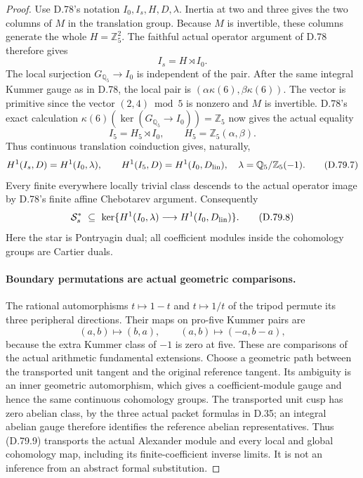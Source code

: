 \begin{proof}
Use D.78's notation \(I_0,I_s,H,D,\lambda\). Inertia at two and
three gives the two columns of \(M\) in the translation group.
Because \(M\) is invertible, these columns generate the whole
\(H=\mathbb Z_5^2\). The faithful actual operator argument of
D.78 therefore gives
\[
 I_s=H\rtimes I_0.
                                                               \tag{D.79.5}
\]
The local surjection \(G_{\mathbb Q_5}\to I_0\) is independent
of the pair. After the same integral Kummer gauge as in D.78,
the local pair is \((\alpha\kappa(6),\beta\kappa(6))\).
The vector is primitive since the vector \((2,4)\bmod5\) is
nonzero and \(M\) is invertible. D.78's exact calculation
\(\kappa(6)(\ker(G_{\mathbb Q_5}\to I_0))=\mathbb Z_5\)
now gives the actual equality
\[
 I_5=H_5\rtimes I_0,
 \qquad H_5=\mathbb Z_5(\alpha,\beta).
                                                               \tag{D.79.6}
\]
Thus continuous translation coinduction gives, naturally,
\[
 H^1(I_s,D)=H^1(I_0,\lambda),\qquad
 H^1(I_5,D)=H^1(I_0,D_{\rm lin}),
 \quad\lambda=\mathbb Q_5/\mathbb Z_5(-1).
                                                               \tag{D.79.7}
\]
Every finite everywhere locally trivial class descends to the actual
operator image by D.78's finite affine Chebotarev argument.
Consequently
\[
 \mathcal S_s^*\ \subseteq\
 \ker\{H^1(I_0,\lambda)\longrightarrow H^1(I_0,D_{\rm lin})\}.
                                                               \tag{D.79.8}
\]
Here the star is Pontryagin dual; all coefficient modules inside
the cohomology groups are Cartier duals.

\paragraph{Boundary permutations are actual geometric comparisons.}
The rational automorphisms \(t\mapsto1-t\) and \(t\mapsto1/t\)
of the tripod permute its three peripheral directions. Their
maps on pro-five Kummer pairs are
\[
 (a,b)\longmapsto(b,a),\qquad
 (a,b)\longmapsto(-a,b-a),                              \tag{D.79.9}
\]
because the extra Kummer class of \(-1\) is zero at five.
These are comparisons of the actual arithmetic fundamental
extensions. Choose a geometric path between the transported unit
tangent and the original reference tangent. Its ambiguity is an
inner geometric automorphism, which gives a coefficient-module
gauge and hence the same continuous cohomology groups. The
transported unit cusp has zero abelian class, by the three actual
packet formulas in D.35; an integral abelian gauge therefore
identifies the reference abelian representatives. Thus (D.79.9)
transports the actual Alexander module and every local and global
cohomology map, including its finite-coefficient inverse limits.
It is not an inference from an abstract formal substitution.


\end{proof}

